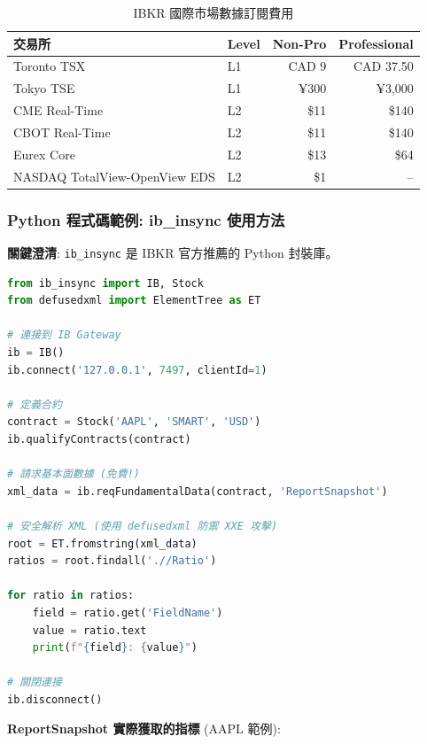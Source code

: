 \documentclass[11pt,a4paper]{article}
\begin{document}
\begin{table}[H]
\centering
\caption{IBKR 國際市場數據訂閱費用}
\small
\begin{tabular}{@{}llrr@{}}
\toprule
\textbf{交易所} & \textbf{Level} & \textbf{Non-Pro} & \textbf{Professional} \\
\midrule
Toronto TSX & L1 & CAD 9 & CAD 37.50 \\
Tokyo TSE & L1 & ¥300 & ¥3,000 \\
CME Real-Time & L2 & \$11 & \$140 \\
CBOT Real-Time & L2 & \$11 & \$140 \\
Eurex Core & L2 & \$13 & \$64 \\
NASDAQ TotalView-OpenView EDS & L2 & \$1 & -- \\
\bottomrule
\end{tabular}
\end{table}

\subsubsection{Python 程式碼範例: ib\_insync 使用方法}

\textbf{關鍵澄清}: \texttt{ib\_insync} 是 IBKR 官方推薦的 Python 封裝庫。

\begin{lstlisting}[language=Python,caption={使用 ib\_insync 獲取基本面數據}]
from ib_insync import IB, Stock
from defusedxml import ElementTree as ET

# 連接到 IB Gateway
ib = IB()
ib.connect('127.0.0.1', 7497, clientId=1)

# 定義合約
contract = Stock('AAPL', 'SMART', 'USD')
ib.qualifyContracts(contract)

# 請求基本面數據 (免費!)
xml_data = ib.reqFundamentalData(contract, 'ReportSnapshot')

# 安全解析 XML (使用 defusedxml 防禦 XXE 攻擊)
root = ET.fromstring(xml_data)
ratios = root.findall('.//Ratio')

for ratio in ratios:
    field = ratio.get('FieldName')
    value = ratio.text
    print(f"{field}: {value}")

# 關閉連接
ib.disconnect()
\end{lstlisting}

\textbf{ReportSnapshot 實際獲取的指標} (AAPL 範例):
\end{document}
